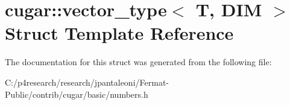 \hypertarget{structcugar_1_1vector__type}{}\section{cugar\+:\+:vector\+\_\+type$<$ T, D\+IM $>$ Struct Template Reference}
\label{structcugar_1_1vector__type}


The documentation for this struct was generated from the following file\+:\begin{DoxyCompactItemize}
\item 
C\+:/p4research/research/jpantaleoni/\+Fermat-\/\+Public/contrib/cugar/basic/numbers.\+h\end{DoxyCompactItemize}
